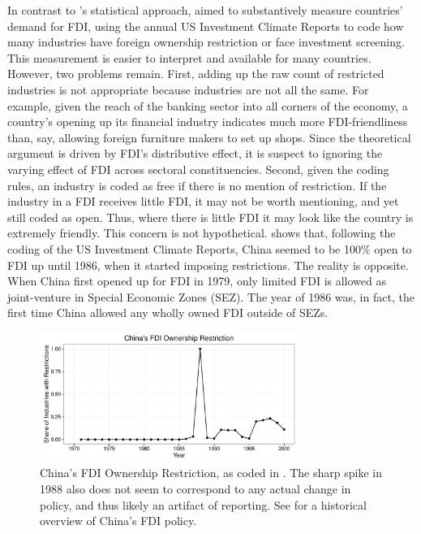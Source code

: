 In contrast to \citet{Pinto2013}'s statistical approach, \citet{Pandya2014, Pandya2016} aimed to substantively measure countries' demand for FDI, using the annual US Investment Climate Reports to code how many industries have foreign ownership restriction or face investment screening. This measurement is easier to interpret and available for many countries. However, two problems remain. First, adding up the raw count of restricted industries is not appropriate because industries are not all the same. For example, given the reach of the banking sector into all corners of the economy, a country's opening up its financial industry indicates much more FDI-friendliness than, say, allowing foreign furniture makers to set up shops. Since the theoretical argument is driven by FDI's distributive effect, it is suspect to ignoring the varying effect of FDI across sectoral constituencies. Second, given the coding rules, an industry is coded as free if there is no mention of restriction. If the industry in a FDI receives little FDI, it may not be worth mentioning, and yet still coded as open. Thus, where there is little FDI it may look like the country is extremely friendly. This concern is not hypothetical.  shows that, following the coding of the US Investment Climate Reports, China seemed to be 100\% open to FDI up until 1986, when it started imposing restrictions. The reality is opposite. When China first opened up for FDI in 1979, only limited FDI is allowed as joint-venture in Special Economic Zones (SEZ). The year of 1986 was, in fact, the first time China allowed any wholly owned FDI outside of SEZs.

\begin{figure}[!ht]
\centering
\includegraphics[width=0.75\textwidth,keepaspectratio]{../figure/china_fdi_restriction}
\caption{China's FDI Ownership Restriction, as coded in \citet{Pandya2010}. The sharp spike in 1988 also does not seem to correspond to any actual change in policy, and thus likely an artifact of reporting. See \citet{Zebregs2002} for a historical overview of China's FDI policy.}
\label{fig:china_fdi_restriction}
\end{figure}



